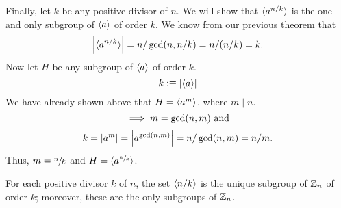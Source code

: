 \begin{prf}
  Finally, let $k$ be any positive divisor of $n$. We will show that $\langle a^{n/k} \rangle$ is the one and only subgroup of $\langle a \rangle$ of order $k$. We know from our previous theorem that
  \begin{equation}
    \abs{\langle a^{n/k} \rangle} = n/\gcd(n,n/k) = n/(n/k) =k.
  \end{equation}
  Now let $H$ be any subgroup of $\langle a \rangle$ of order $k$.
  \begin{equation}
    k :\equiv \abs{\langle a \rangle}
  \end{equation}
  We have already shown above that $H = \langle a^m \rangle$, where $m \mid n$.
  \begin{equation}
    \implies m=\gcd(n,m) $ and$
  \end{equation}
  \begin{equation}
    k = \abs{a^m} = \abs{a^{\gcd(n,m)}}=n/\gcd(n,m) = n/m.
  \end{equation}
Thus, $m = \sfrac{n}{k} $ and $ H = \langle a^{\sfrac{n}{k}} \rangle$.
\end{prf}

\begin{corollary} 
  For each positive divisor $k$ of $n$, the set $\langle n/k \rangle$ is the unique subgroup of $\mathbb{Z}_n$ of order $k$; moreover, these are the only subgroups of $\mathbb{Z}_n$.
\end{corollary}
